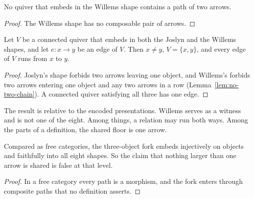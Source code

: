 \begin{lemma}
  \label{lem:no-two-chain}
  \leanok
  No quiver that embeds in the Willems shape contains a path of two arrows.
\end{lemma}

\begin{proof}
  \leanok
  The Willems shape has no composable pair of arrows.
\end{proof}

\begin{theorem}
  \label{thm:single-arrow}
  \leanok
  Let $V$ be a connected quiver that embeds in both the Joslyn and the
  Willems shapes, and let $e : x \to y$ be an edge of $V$. Then $x \neq y$,
  $V = \{x, y\}$, and every edge of $V$ runs from $x$ to $y$.
\end{theorem}

\begin{proof}
  \leanok
  Joslyn's shape forbids two arrows leaving one object, and Willems's forbids
  two arrows entering one object and any two arrows in a row
  (Lemma~\ref{lem:no-two-chain}). A connected quiver satisfying all three
  has one edge.
\end{proof}

\begin{remark}
  The result is relative to the encoded presentations. Willems serves as a
  witness and is not one of the eight. Among things, a relation may run both
  ways. Among the parts of a definition, the shared floor is one arrow.
\end{remark}

\begin{theorem}
  \label{thm:maximality-fails}
  \leanok
  Compared as free categories, the three-object fork embeds injectively on
  objects and faithfully into all eight shapes. So the claim that nothing
  larger than one arrow is shared is false at that level.
\end{theorem}

\begin{proof}
  \leanok
  In a free category every path is a morphism, and the fork enters through
  composite paths that no definition asserts.
\end{proof}

